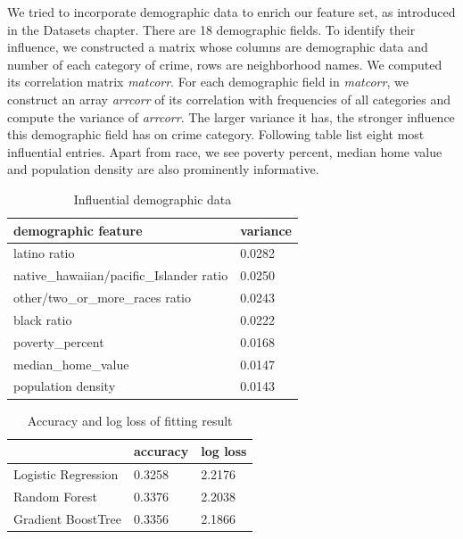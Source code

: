 \documentclass[11pt,conference]{IEEEtran}
\begin{document}
We tried to incorporate demographic data to enrich our feature set, as introduced in the Datasets chapter. There are 18 demographic fields. To identify their influence, we constructed a matrix whose columns are demographic data and number of each category of crime, rows are neighborhood names. We computed its correlation matrix \textit{matcorr}. For each demographic field in \textit{matcorr}, we construct an array \textit{arrcorr} of its correlation with frequencies of all categories and compute the variance of \textit{arrcorr}. The larger variance it has, the stronger influence this demographic field has on crime category. Following table list eight most influential  entries. Apart from race, we see poverty percent, median home value and population density are also prominently informative.
\begin{table}[h]
\centering
\caption{Influential demographic data}
\label{my-label}
\begin{tabular}{|l|l|}
\hline
demographic feature                      & variance \\ \hline
latino ratio                             & 0.0282   \\ \hline
native\_hawaiian/pacific\_Islander ratio & 0.0250   \\ \hline
other/two\_or\_more\_races ratio         & 0.0243   \\ \hline
black ratio                                    & 0.0222   \\ \hline
poverty\_percent                         & 0.0168   \\ \hline
median\_home\_value                      & 0.0147   \\ \hline
population density                                  & 0.0143   \\ \hline
\end{tabular}
\end{table}

\begin{table}[h]
\centering
\caption{Accuracy and log loss of fitting result}
\label{my-label}
\begin{tabular}{|l|l|l|}
\hline
                    & accuracy & log loss \\ \hline
Logistic Regression & 0.3258        & 2.2176   \\ \hline
Random Forest       & 0.3376        & 2.2038   \\ \hline
Gradient BoostTree  & 0.3356        & 2.1866   \\ \hline
\end{tabular}
\end{table}
\end{document}
